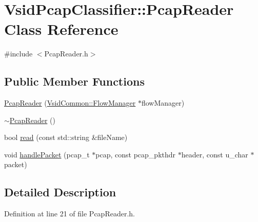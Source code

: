 \hypertarget{class_vsid_pcap_classifier_1_1_pcap_reader}{\section{Vsid\-Pcap\-Classifier\-:\-:Pcap\-Reader Class Reference}
\label{class_vsid_pcap_classifier_1_1_pcap_reader}
}


{\ttfamily \#include $<$Pcap\-Reader.\-h$>$}

\subsection*{Public Member Functions}
\begin{DoxyCompactItemize}
\item 
\hyperlink{class_vsid_pcap_classifier_1_1_pcap_reader_ad30ce38bfe5ec766670158205a5d2a2f}{Pcap\-Reader} (\hyperlink{class_vsid_common_1_1_flow_manager}{Vsid\-Common\-::\-Flow\-Manager} $\ast$flow\-Manager)
\item 
\hyperlink{class_vsid_pcap_classifier_1_1_pcap_reader_ab352e31cf9a3320ad390d5101d022e5b}{$\sim$\-Pcap\-Reader} ()
\item 
bool \hyperlink{class_vsid_pcap_classifier_1_1_pcap_reader_a8d73bbb229734e2bacce29f212ca2f6d}{read} (const std\-::string \&file\-Name)
\item 
void \hyperlink{class_vsid_pcap_classifier_1_1_pcap_reader_a1e206d73c80ef174903861f22a2e6336}{handle\-Packet} (pcap\-\_\-t $\ast$pcap, const pcap\-\_\-pkthdr $\ast$header, const u\-\_\-char $\ast$packet)
\end{DoxyCompactItemize}


\subsection{Detailed Description}


Definition at line 21 of file Pcap\-Reader.\-h.




